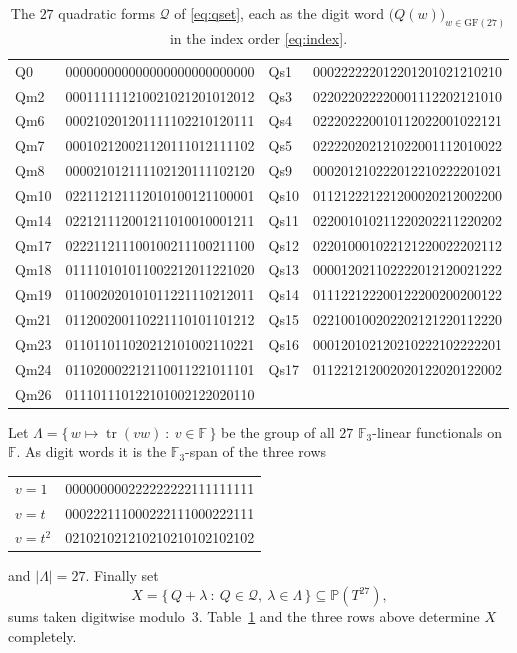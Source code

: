 \documentclass[11pt]{amsart}
\theoremstyle{remark}
\newcommand{\Fq}{\mathbb{F}}
\newcommand{\tr}{\operatorname{tr}}
\newcommand{\GF}{\mathrm{GF}}
\begin{document}
\begin{table}[htbp]
\caption{The $27$ quadratic forms $\mathcal Q$ of \eqref{eq:qset}, each as the
digit word $\bigl(Q(w)\bigr)_{w\in\GF(27)}$ in the index order
\eqref{eq:index}.}
\label{tab:forms}
\begin{center}
\ttfamily\footnotesize
\begin{tabular}{@{}ll@{\qquad}ll@{}}
Q0   & 000000000000000000000000000 & Qs1  & 000222222012201201021210210\\
Qm2  & 000111111210021021201012012 & Qs3  & 022022022220001112202121010\\
Qm6  & 000210201201111102210120111 & Qs4  & 022202220010112022001022121\\
Qm7  & 000102120021120111012111102 & Qs5  & 022220202121022001112010022\\
Qm8  & 000021012111102120111102120 & Qs9  & 000201210222012210222201021\\
Qm10 & 022112121112010100121100001 & Qs10 & 011212221221200020212002200\\
Qm14 & 022121112001211010010001211 & Qs11 & 022001010211220202211220202\\
Qm17 & 022211211100100211100211100 & Qs12 & 022010001022121220022202112\\
Qm18 & 011110101011002212011221020 & Qs13 & 000012021102222012120021222\\
Qm19 & 011002020101011221110212011 & Qs14 & 011122122200122200200200122\\
Qm21 & 011200200110221110101101212 & Qs15 & 022100100202202121220112220\\
Qm23 & 011011011020212101002110221 & Qs16 & 000120102120210222102222201\\
Qm24 & 011020002212110011221011101 & Qs17 & 011221212002020122020122002\\
Qm26 & 011101110122101002122020110 &      & \\
\end{tabular}
\end{center}
\end{table}

Let $\Lambda=\{\,w\mapsto\tr(vw)\ :\ v\in\Fq\,\}$ be the group of all $27$
$\Fq_{3}$-linear functionals on $\Fq$. As digit words it is the $\Fq_{3}$-span
of the three rows
\begin{center}
\ttfamily\footnotesize
\begin{tabular}{@{}ll@{}}
$v=1$   & 000000000222222222111111111\\
$v=t$   & 000222111000222111000222111\\
$v=t^2$ & 021021021210210210102102102\\
\end{tabular}
\end{center}
and $|\Lambda|=27$. Finally set
\begin{equation}\label{eq:X}
  \boxed{\ X=\{\,Q+\lambda\ :\ Q\in\mathcal Q,\ \lambda\in\Lambda\,\}
  \subseteq\mathbb P(T^{27}),\ }
\end{equation}
sums taken digitwise modulo~$3$. Table~\ref{tab:forms} and the three rows above
determine $X$ completely.
\end{document}
